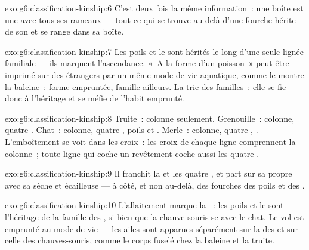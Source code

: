 \begin{solution}{exo:g6:classification-kinship:6}
C'est deux fois la même information~: une boîte est une  avec
tous ses rameaux --- tout ce qui se trouve au-delà d'une fourche
hérite de son  et se range dans sa boîte.
\end{solution}

\begin{solution}{exo:g6:classification-kinship:7}
Les poils et le  sont hérités le long d'une seule lignée
familiale --- ils marquent l'ascendance. «~A la forme d'un
poisson~» peut être imprimé sur des étrangers par un même mode de
vie aquatique, comme le montre la baleine~: forme empruntée, famille
ailleurs. La  trie des familles~: elle se fie donc à
l'héritage et se méfie de l'habit emprunté.
\end{solution}

\begin{solution}{exo:g6:classification-kinship:8}
Truite~: colonne seulement. Grenouille~: colonne, quatre .
Chat~: colonne, quatre , poils et . Merle~: colonne,
quatre , . L'emboîtement se voit dans les croix~: les
croix de chaque ligne comprennent la colonne~; toute ligne qui coche
un revêtement coche aussi les quatre .
\end{solution}

\begin{solution}{exo:g6:classification-kinship:9}
Il franchit la  et les quatre , et part sur
sa propre  avec sa  sèche et écailleuse --- à côté, et
non au-delà, des fourches des poils et des .
\end{solution}

\begin{solution}{exo:g6:classification-kinship:10}
L'allaitement marque la ~: les poils et le  sont
l'héritage de la famille des , si bien que la
chauve-souris se  avec le chat. Le vol est emprunté au mode
de vie --- les ailes sont apparues séparément sur la  des
 et sur celle des chauves-souris, comme le corps fuselé chez
la baleine et la truite.
\end{solution}

